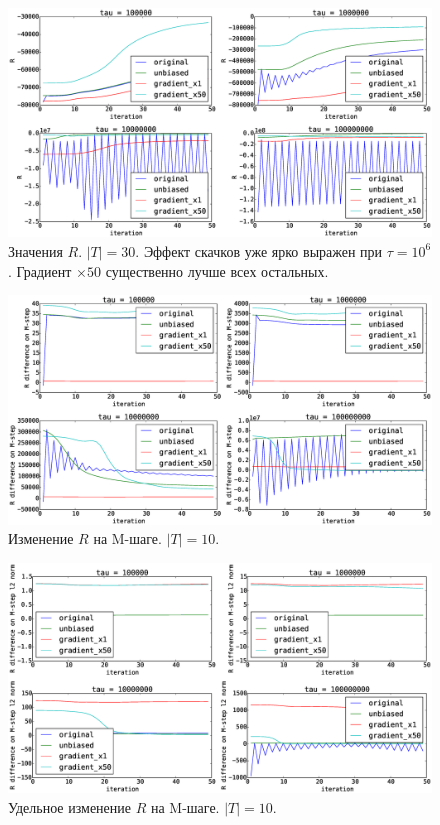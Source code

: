 \documentclass[utf8]{beamer}
\begin{document}
	\begin{frame}
\begin{figure}
	\centering   
	\caption{Значения $R$. $|T| = 30$. Эффект скачков уже ярко выражен при $\tau = 10^6$. Градиент $\times 50$ существенно лучше всех остальных.} 
	\medskip
	\includegraphics[width=0.9\linewidth]{presentation_pictures/topics_30_R_values.eps}  
\end{figure}
	\end{frame}
	
	\begin{frame}
\begin{figure}
	\centering
	\caption{Изменение $R$ на M-шаге. $|T| = 10$.}    
	\includegraphics[width=1.0\linewidth]{presentation_pictures/topics_10_RMstepDiff}
\end{figure}
	\end{frame}
	
	\begin{frame}
\begin{figure}
	\centering
	\caption{Удельное изменение $R$ на M-шаге. $|T| = 10$.}    
	\includegraphics[width=1.0\linewidth]{presentation_pictures/topics_10_RMstepDiffPerL2}
\end{figure}
	\end{frame}
	
\end{document}
